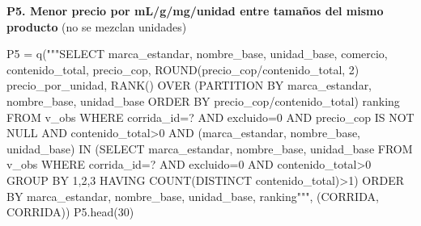 \documentclass[
  spanish,
  letterpaper,
  DIV=11,
  numbers=noendperiod]{scrartcl}
\newenvironment{Shaded}{\begin{snugshade}}{\end{snugshade}}
\newcommand{\DecValTok}[1]{\textcolor[rgb]{0.68,0.00,0.00}{#1}}
\newcommand{\NormalTok}[1]{\textcolor[rgb]{0.00,0.23,0.31}{#1}}
\newcommand{\OperatorTok}[1]{\textcolor[rgb]{0.37,0.37,0.37}{#1}}
\newcommand{\StringTok}[1]{\textcolor[rgb]{0.13,0.47,0.30}{#1}}
\begin{document}
\textbf{P5. Menor precio por mL/g/mg/unidad entre tamaños del mismo
producto} (no se mezclan unidades)

\begin{Shaded}
\begin{Highlighting}[]
\NormalTok{P5 }\OperatorTok{=}\NormalTok{ q(}\StringTok{"""SELECT marca\_estandar, nombre\_base, unidad\_base, comercio, contenido\_total, precio\_cop,}
\StringTok{ ROUND(precio\_cop/contenido\_total, 2) precio\_por\_unidad,}
\StringTok{ RANK() OVER (PARTITION BY marca\_estandar, nombre\_base, unidad\_base ORDER BY precio\_cop/contenido\_total) ranking}
\StringTok{FROM v\_obs WHERE corrida\_id=? AND excluido=0 AND precio\_cop IS NOT NULL AND contenido\_total\textgreater{}0}
\StringTok{ AND (marca\_estandar, nombre\_base, unidad\_base) IN (SELECT marca\_estandar, nombre\_base, unidad\_base FROM v\_obs}
\StringTok{   WHERE corrida\_id=? AND excluido=0 AND contenido\_total\textgreater{}0 GROUP BY 1,2,3 HAVING COUNT(DISTINCT contenido\_total)\textgreater{}1)}
\StringTok{ORDER BY marca\_estandar, nombre\_base, unidad\_base, ranking"""}\NormalTok{, (CORRIDA, CORRIDA))}
\NormalTok{P5.head(}\DecValTok{30}\NormalTok{)}
\end{Highlighting}
\end{Shaded}
\end{document}
